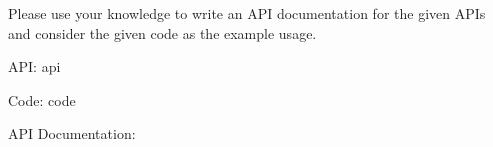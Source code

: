 Please use your knowledge to write an API documentation for the given APIs and consider the given 
code as the example usage.

API:
{api}

Code:
{code}

API Documentation: